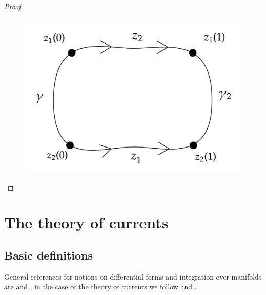 \begin{proof}
 \begin{figure}[h!]
	\centering  
  \includegraphics[scale=.18]{finalpaths}
  \caption{}
  \label{fig:finalpaths}
\end{figure}
\end{proof}

\section{The theory of currents}\label{corrientes}

\subsection{Basic definitions}

General references for notions on differential forms and integration over manifolds are \cite{spivak} and \cite{bredon}, in the case of the theory of currents we follow \cite{fornaes} and \cite{demailly}.\\

